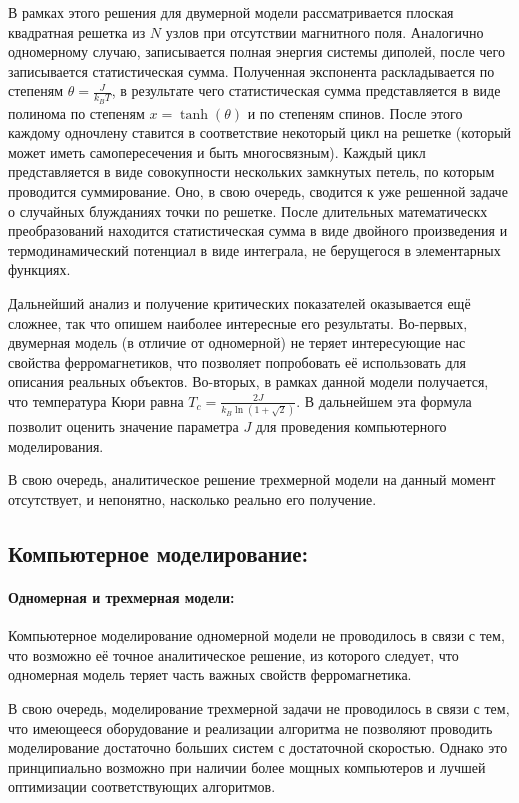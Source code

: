 \documentclass[oneside,final,14pt]{extarticle}
\begin{document}
	В рамках этого решения для двумерной модели рассматривается плоская квадратная решетка из $N$ узлов при отсутствии магнитного поля. Аналогично одномерному случаю, записывается полная энергия системы диполей, после чего записывается статистическая сумма. Полученная экспонента раскладывается по степеням $\theta = \frac{J}{k_{B}T}$, в результате чего статистическая сумма представляется в виде полинома по степеням $x=\tanh(\theta)$ и по степеням спинов. После этого каждому одночлену ставится в соответствие некоторый цикл на решетке (который может иметь самопересечения и быть многосвязным). Каждый цикл представляется в виде совокупности нескольких замкнутых петель, по которым проводится суммирование. Оно, в свою очередь, сводится к уже решенной задаче о случайных блужданиях точки по решетке. После длительных математическх преобразований находится статистическая сумма в виде двойного произведения и термодинамический потенциал в виде интеграла, не берущегося в элементарных функциях. 
	
	Дальнейший анализ и получение критических показателей оказывается ещё сложнее, так что опишем наиболее интересные его результаты. Во-первых, двумерная модель (в отличие от одномерной) не теряет интересующие нас свойства ферромагнетиков, что позволяет попробовать её использовать для описания реальных объектов. Во-вторых, в рамках данной модели получается, что температура Кюри равна $T_{c}=\frac{2J}{k_{B}\ln(1+\sqrt{2})}$. В дальнейшем эта формула позволит оценить значение параметра $J$ для проведения компьютерного моделирования. 
	
	В свою очередь, аналитическое решение трехмерной модели на данный момент отсутствует, и непонятно, насколько реально его получение. 
	\subsection{Компьютерное моделирование:}
	\paragraph{Одномерная и трехмерная модели:}
	Компьютерное моделирование одномерной модели не проводилось в связи с тем, что возможно её точное аналитическое решение, из которого следует, что одномерная модель теряет часть важных свойств ферромагнетика. 
	
	В свою очередь, моделирование трехмерной задачи не проводилось в связи с тем, что имеющееся оборудование и реализации алгоритма не позволяют проводить моделирование достаточно больших систем с достаточной скоростью. Однако это принципиально возможно при наличии более мощных компьютеров и лучшей оптимизации соответствующих алгоритмов. 
\end{document}
